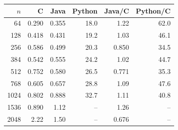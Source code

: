 \begin{tabular}{rrrrrr}
\toprule
$n$ & C & Java & Python & Java/C & Python/C \\
\midrule
64 & 0.290 & 0.355 & 18.0 & 1.22 & 62.0 \\
128 & 0.418 & 0.431 & 19.2 & 1.03 & 46.1 \\
256 & 0.586 & 0.499 & 20.3 & 0.850 & 34.5 \\
384 & 0.542 & 0.555 & 24.2 & 1.02 & 44.7 \\
512 & 0.752 & 0.580 & 26.5 & 0.771 & 35.3 \\
768 & 0.605 & 0.657 & 28.8 & 1.09 & 47.6 \\
1024 & 0.802 & 0.888 & 32.7 & 1.11 & 40.8 \\
1536 & 0.890 & 1.12 & -- & 1.26 & -- \\
2048 & 2.22 & 1.50 & -- & 0.676 & -- \\
\bottomrule
\end{tabular}
